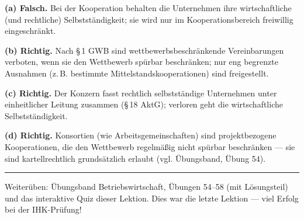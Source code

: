 \documentclass[11pt, a4paper]{article}
\begin{document}
\begin{loesung}[title={Lösung Aufgabe~9 --- Richtig oder falsch?}]
\textbf{(a) Falsch.} Bei der Kooperation behalten die Unternehmen ihre wirtschaftliche
(und rechtliche) Selbstständigkeit; sie wird nur im Kooperationsbereich freiwillig
eingeschränkt.

\textbf{(b) Richtig.} Nach \S\,1 GWB sind wettbewerbsbeschränkende Vereinbarungen
verboten, wenn sie den Wettbewerb spürbar beschränken; nur eng begrenzte Ausnahmen
(z.\,B. bestimmte Mittelstandskooperationen) sind freigestellt.

\textbf{(c) Richtig.} Der Konzern fasst rechtlich selbstständige Unternehmen unter
einheitlicher Leitung zusammen (\S\,18 AktG); verloren geht die wirtschaftliche
Selbstständigkeit.

\textbf{(d) Richtig.} Konsortien (wie Arbeitsgemeinschaften) sind projektbezogene
Kooperationen, die den Wettbewerb regelmäßig nicht spürbar beschränken --- sie sind
kartellrechtlich grundsätzlich erlaubt (vgl. Übungsband, Übung 54).
\end{loesung}

\vspace{1em}
\hrule
\vspace{0.8em}
\noindent\textsf{\small Weiterüben: Übungsband Betriebswirtschaft, Übungen 54--58 (mit Lösungsteil) und das
interaktive Quiz dieser Lektion. Dies war die letzte Lektion --- viel Erfolg bei der IHK-Prüfung!}
\end{document}
